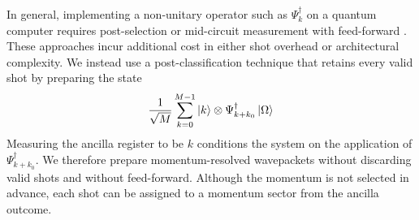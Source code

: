 \documentclass[aps,floatfix,10pt,amssymb,amsfont,amsmath,superscriptaddress,float,nofootinbib,longbibliography,nobalancelastpage,twocolumn]{revtex4-2}
\begin{document}
In general, implementing a non-unitary operator such as $\Psi^{\dagger}_k$ on a quantum computer requires post-selection or mid-circuit measurement with feed-forward \cite{childs2012hamiltonian, turco2025creation, Gily_n_2019, mcardle2026quantum, o2025quantum, corcoles2021exploiting, pino2021demonstration, turco2025creation}. These approaches incur additional cost in either shot overhead or architectural complexity. We instead use a post-classification technique that retains every valid shot by preparing the state
\begin{equation}
    \frac{1}{\sqrt{M}}\sum_{k=0}^{M-1} \ket{k}\otimes\Psi_{k+k_0}^{\dagger}\ket{\Omega} 
\end{equation}
Measuring the ancilla register to be $k$ conditions the system on the application of $\Psi^{\dagger}_{k+k_0}$. We therefore prepare momentum-resolved wavepackets without discarding valid shots and without feed-forward. Although the momentum is not selected in advance, each shot can be assigned to a momentum sector from the ancilla outcome.
\end{document}
